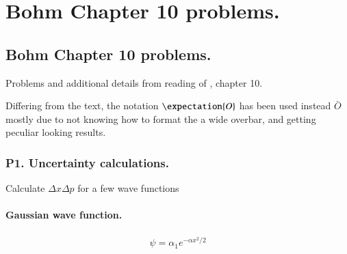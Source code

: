 
%
%




\chapter{Bohm Chapter 10 problems. }
\label{chap:bohmCh10}
\date{ April 23, 2009.  $RCSfile: bohmCh10.tex,v $ Last $Revision: 1.19 $ $Date: 2009/06/14 23:51:45 $ }

%

\section{Bohm Chapter 10 problems. }

Problems and additional details from reading of \citep{bohm1989qt}, chapter 10.

Differing from the text, the notation $\expectation{O}$ has been used instead $\bar{O}$ mostly due to not knowing how to format the a wide overbar, and getting peculiar looking results.

\subsection{P1. Uncertainty calculations. }

Calculate $\Delta x \Delta p$ for a few wave functions

\subsubsection{Gaussian wave function. }

\begin{align*}
\psi = \alpha_1 e^{-\alpha x^2/2}
\end{align*}

